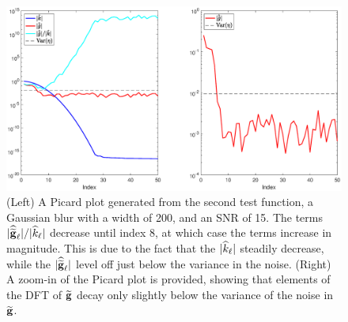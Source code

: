 \begin{figure}[htb]
	\centerline{\includegraphics[scale = 0.45]{Figures/PicardPlot1D_F2_S15_W200.eps}}
\caption{(Left) A Picard plot generated from the second test function, a Gaussian blur with a width of 200, and an SNR of 15. The terms $|\widehat{\widetilde{\mathbf{g}}}_\ell|/|\widehat{k}_\ell|$ decrease until index 8, at which case the terms increase in magnitude. This is due to the fact that the $|\widehat{k}_\ell|$ steadily decrease, while the $|\widehat{\widetilde{\mathbf{g}}}_\ell|$ level off just below the variance in the noise. (Right) A zoom-in of the Picard plot is provided, showing that elements of the DFT of $\widetilde{\mathbf{g}}$ decay only slightly below the variance of the noise in $\widetilde{\mathbf{g}}$.}
\label{PicardPlot}
\end{figure}

